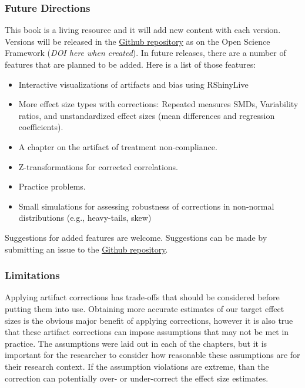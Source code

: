 \documentclass[
  letterpaper,
  DIV=11,
  numbers=noendperiod]{scrreprt}
\providecommand{\tightlist}{%
  \setlength{\itemsep}{0pt}\setlength{\parskip}{0pt}}\usepackage{longtable,booktabs,array}
\begin{document}
\subsubsection*{Future Directions}\label{future-directions}

This book is a living resource and it will add new content with each
version. Versions will be released in the
\href{https://github.com/MatthewBJane/artifact-corrections-for-effect-sizes/}{Github
repository} as on the Open Science Framework (\emph{DOI here when
created}). In future releases, there are a number of features that are
planned to be added. Here is a list of those features:

\begin{itemize}
\tightlist
\item
  Interactive visualizations of artifacts and bias using RShinyLive
\item
  More effect size types with corrections: Repeated measures SMDs,
  Variability ratios, and unstandardized effect sizes (mean differences
  and regression coefficients).
\item
  A chapter on the artifact of treatment non-compliance.
\item
  Z-transformations for corrected correlations.
\item
  Practice problems.
\item
  Small simulations for assessing robustness of corrections in
  non-normal distributions (e.g., heavy-tails, skew)
\end{itemize}

Suggestions for added features are welcome. Suggestions can be made by
submitting an issue to the
\href{https://github.com/MatthewBJane/artifact-corrections-for-effect-sizes/}{Github
repository}.

\subsubsection*{Limitations}\label{limitations}

Applying artifact corrections has trade-offs that should be considered
before putting them into use. Obtaining more accurate estimates of our
target effect sizes is the obvious major benefit of applying
corrections, however it is also true that these artifact corrections can
impose assumptions that may not be met in practice. The assumptions were
laid out in each of the chapters, but it is important for the researcher
to consider how reasonable these assumptions are for their research
context. If the assumption violations are extreme, than the correction
can potentially over- or under-correct the effect size estimates.
\end{document}
